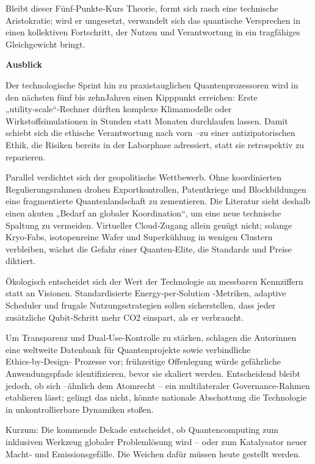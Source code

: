 Bleibt dieser Fünf‑Punkte‑Kurs Theorie, formt sich rasch eine technische Aristokratie; wird er umgesetzt, verwandelt sich das quantische Versprechen in einen kollektiven Fortschritt, der Nutzen und Verantwortung in ein tragfähiges Gleichgewicht bringt.



\textbf{Ausblick}


Der technologische Sprint hin zu praxistauglichen Quantenprozessoren wird in den nächsten fünf bis zehnJahren einen Kipppunkt erreichen: Erste „utility‑scale“‑Rechner dürften komplexe Klimamodelle oder Wirkstoffsimulationen in Stunden statt Monaten durchlaufen lassen. Damit schiebt sich die ethische Verantwortung nach vorn –zu einer antizipatorischen Ethik, die Risiken bereits in der Laborphase adressiert, statt sie retrospektiv zu reparieren.

Parallel verdichtet sich der geopolitische Wettbewerb. Ohne koordinierten Regulierungsrahmen drohen Exportkontrollen, Patentkriege und Blockbildungen eine fragmentierte Quantenlandschaft zu zementieren. Die Literatur sieht deshalb einen akuten „Bedarf an globaler Koordination“, um eine neue technische Spaltung zu vermeiden. Virtueller Cloud‑Zugang allein genügt nicht; solange Kryo‑Fabs, isotopenreine Wafer und Superkühlung in wenigen Clustern verbleiben, wächst die Gefahr einer Quanten‑Elite, die Standards und Preise diktiert.

Ökologisch entscheidet sich der Wert der Technologie an messbaren Kennziffern statt an Visionen. Standardisierte Energy‑per‑Solution ‑Metriken, adaptive Scheduler und frugale Nutzungsstrategien sollen sicherstellen, dass jeder zusätzliche Qubit‑Schritt mehr CO2 einspart, als er verbraucht.

Um Transparenz und Dual‑Use‑Kontrolle zu stärken, schlagen die Autor\*innen eine weltweite Datenbank für Quantenprojekte sowie verbindliche Ethics‑by‑Design‑ Prozesse vor; frühzeitige Offenlegung würde gefährliche Anwendungspfade identifizieren, bevor sie skaliert werden. Entscheidend bleibt jedoch, ob sich –ähnlich dem Atomrecht – ein multilateraler Governance‑Rahmen etablieren lässt; gelingt das nicht, könnte nationale Abschottung die Technologie in unkontrollierbare Dynamiken stoßen.

Kurzum: Die kommende Dekade entscheidet, ob Quantencomputing zum inklusiven Werkzeug globaler Problemlösung wird – oder zum Katalysator neuer Macht‑ und Emissionsgefälle. Die Weichen dafür müssen heute gestellt werden.



















